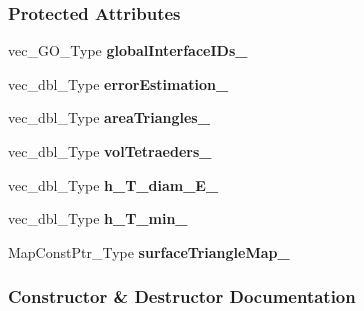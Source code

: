 \subsubsection*{Protected Attributes}
\begin{DoxyCompactItemize}
\item 
\mbox{\label{classFEDD_1_1RefinementFactory_ae002a5a1ec8fc3bb73732ff2352c4862}} 
vec\+\_\+\+G\+O\+\_\+\+Type {\bfseries global\+Interface\+I\+Ds\+\_\+}
\item 
\mbox{\label{classFEDD_1_1RefinementFactory_ae302e2206ae316c35a867102d138e87b}} 
vec\+\_\+dbl\+\_\+\+Type {\bfseries error\+Estimation\+\_\+}
\item 
\mbox{\label{classFEDD_1_1RefinementFactory_a71c183c92df6290b33e3be93586da892}} 
vec\+\_\+dbl\+\_\+\+Type {\bfseries area\+Triangles\+\_\+}
\item 
\mbox{\label{classFEDD_1_1RefinementFactory_a264fd2f5a2f96d46c7dcf162662507a1}} 
vec\+\_\+dbl\+\_\+\+Type {\bfseries vol\+Tetraeders\+\_\+}
\item 
\mbox{\label{classFEDD_1_1RefinementFactory_a52229723b27f7c4c1ca2d17228940753}} 
vec\+\_\+dbl\+\_\+\+Type {\bfseries h\+\_\+\+T\+\_\+diam\+\_\+\+E\+\_\+}
\item 
\mbox{\label{classFEDD_1_1RefinementFactory_aa9f0bb022d2c263689079e59c8300fd5}} 
vec\+\_\+dbl\+\_\+\+Type {\bfseries h\+\_\+\+T\+\_\+min\+\_\+}
\item 
\mbox{\label{classFEDD_1_1RefinementFactory_a6cca7914bcb8c88bb72ba704a1406444}} 
Map\+Const\+Ptr\+\_\+\+Type {\bfseries surface\+Triangle\+Map\+\_\+}
\end{DoxyCompactItemize}


\subsubsection{Constructor \& Destructor Documentation}
\mbox{\label{classFEDD_1_1RefinementFactory_a3f60708ffc7693357aa56cf5717c1127}} 

